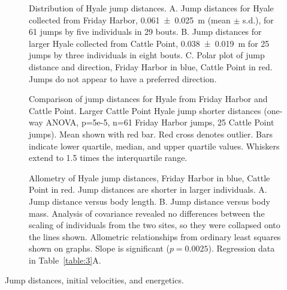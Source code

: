 \documentclass{article}
\begin{document}
\begin{figure}
\caption{ Distribution of Hyale jump distances.  A.  Jump distances for Hyale collected from Friday Harbor, \SI{0.061\pm0.025}{\meter} (mean $\pm$ s.d.), for  61 jumps by five individuals in 29 bouts. B.  Jump distances for larger Hyale collected from Cattle Point, \SI{0.038\pm0.019}{\meter} for 25 jumps by three individuals in eight bouts.  C.  Polar plot of jump distance and direction, Friday Harbor in blue, Cattle Point in red.  Jumps do not appear to have a preferred direction.}
\label{fig:9}
\end{figure}

\begin{figure}
\caption{Comparison of jump distances for Hyale from Friday Harbor and Cattle Point.  Larger Cattle Point Hyale jump shorter distances (one-way ANOVA, p=5e-5, n=61 Friday Harbor jumps, 25 Cattle Point jumps).  Mean shown with red bar.  Red cross denotes outlier.  Bars indicate lower quartile, median, and upper quartile values. Whiskers extend to 1.5 times the interquartile range.}
\label{fig:10}
\end{figure}

\begin{figure}
\caption{Allometry of Hyale jump distances, Friday Harbor in blue, Cattle Point in red.  Jump distances are shorter in larger individuals.  A.  Jump distance versus body length.  B.  Jump distance versus body mass.  Analysis of covariance revealed no differences between the scaling of individuals from the two sites, so they were collapsed onto the lines shown.   Allometric relationships from ordinary least squares shown on graphs.  Slope is significant ($p=0.0025$).  Regression data in Table~\ref{table:3}A. }
\label{fig:11}
\end{figure}

\begin{table}
\caption{Jump distances, initial velocities, and energetics.}
\label{table:3}
\end{table}
\end{document}
